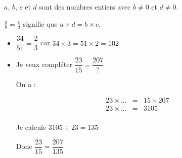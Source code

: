 \begin{myprop}
	$a$, $b$, $c$ et $d$  sont des nombres entiers avec $b \neq 0$ et $ d \neq 0$.
	
	$\frac{a}{b} = \frac{c}{d}$ signifie que $a \times d = b \times c$.
	
	 
\end{myprop}


\begin{myexs}
	\begin{itemize}
		\item $\dfrac{34}{51} = \dfrac{2}{3}$ car $34 \times 3 = 51 \times 2 = 102$
		
		\item Je veux compléter $\dfrac{23}{15} = \dfrac{207}{?}$
		
		On a :
		
		\begin{eqnarray*}
			23 \times ... &=& 15 \times 207 \\
			23 \times ... &=& \num{3105} \\
		\end{eqnarray*}
		
		Je calcule $\num{3105} \div 23 = 135$
		
		Donc $\dfrac{23}{15} = \dfrac{207}{135}$
	\end{itemize}
	
\end{myexs}